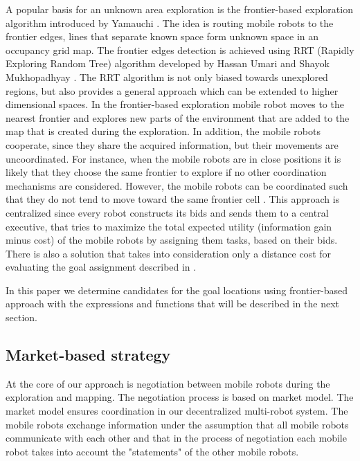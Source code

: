 \documentclass[letterpaper, 10 pt, conference]{ieeeconf}  %
\begin{document}
A popular basis for an unknown area exploration is the frontier-based exploration algorithm introduced by Yamauchi \cite{Yamauchi}. The idea is routing mobile robots to the frontier edges, lines that separate known space form unknown space in an occupancy grid map. The frontier edges detection is achieved using RRT (Rapidly Exploring Random Tree) algorithm developed by Hassan Umari and Shayok Mukhopadhyay \cite{Umari}. The RRT algorithm is not only biased towards unexplored regions, but also provides a general approach which can be extended to higher dimensional spaces.
In the frontier-based exploration mobile robot moves to the nearest frontier and explores new parts of the environment that are added to the map that is created during the exploration.
In addition, the mobile robots cooperate, since they share the acquired information, but their movements are uncoordinated. For instance, when the mobile robots are in close positions it is likely that they choose the same frontier to explore if no other coordination mechanisms are considered. However, the mobile robots can be coordinated such that they do not tend to move toward the same frontier cell \cite{burgard}. This approach is centralized since every robot constructs its bids and sends them to a central executive, that tries to maximize the total expected utility (information gain minus cost) of the mobile robots by assigning them tasks, based on their bids.  There is also a solution that takes into consideration only a distance cost for evaluating the goal assignment described in \cite{distance-cost}. 

In this paper we determine candidates for the goal locations using frontier-based approach with the expressions and functions that will be described in the next section. 

\subsection{Market-based strategy} 

At the core of our approach is negotiation between mobile robots during the exploration and mapping. The negotiation process is based on market model. The market model ensures coordination in our decentralized multi-robot system. The mobile robots exchange information under the assumption that all mobile robots communicate with each other and that in the process of negotiation each mobile robot takes into account the "statements" of the other mobile robots.
\end{document}
